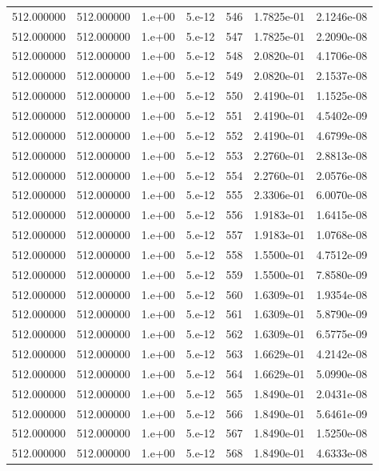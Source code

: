 \begin{table}[htbp]
\begin{tabular}{rrrrrrr}
512.000000 & 512.000000 & 1.e+00 & 5.e-12 & 546 & 1.7825e-01 & 2.1246e-08 \\
512.000000 & 512.000000 & 1.e+00 & 5.e-12 & 547 & 1.7825e-01 & 2.2090e-08 \\
512.000000 & 512.000000 & 1.e+00 & 5.e-12 & 548 & 2.0820e-01 & 4.1706e-08 \\
512.000000 & 512.000000 & 1.e+00 & 5.e-12 & 549 & 2.0820e-01 & 2.1537e-08 \\
512.000000 & 512.000000 & 1.e+00 & 5.e-12 & 550 & 2.4190e-01 & 1.1525e-08 \\
512.000000 & 512.000000 & 1.e+00 & 5.e-12 & 551 & 2.4190e-01 & 4.5402e-09 \\
512.000000 & 512.000000 & 1.e+00 & 5.e-12 & 552 & 2.4190e-01 & 4.6799e-08 \\
512.000000 & 512.000000 & 1.e+00 & 5.e-12 & 553 & 2.2760e-01 & 2.8813e-08 \\
512.000000 & 512.000000 & 1.e+00 & 5.e-12 & 554 & 2.2760e-01 & 2.0576e-08 \\
512.000000 & 512.000000 & 1.e+00 & 5.e-12 & 555 & 2.3306e-01 & 6.0070e-08 \\
512.000000 & 512.000000 & 1.e+00 & 5.e-12 & 556 & 1.9183e-01 & 1.6415e-08 \\
512.000000 & 512.000000 & 1.e+00 & 5.e-12 & 557 & 1.9183e-01 & 1.0768e-08 \\
512.000000 & 512.000000 & 1.e+00 & 5.e-12 & 558 & 1.5500e-01 & 4.7512e-09 \\
512.000000 & 512.000000 & 1.e+00 & 5.e-12 & 559 & 1.5500e-01 & 7.8580e-09 \\
512.000000 & 512.000000 & 1.e+00 & 5.e-12 & 560 & 1.6309e-01 & 1.9354e-08 \\
512.000000 & 512.000000 & 1.e+00 & 5.e-12 & 561 & 1.6309e-01 & 5.8790e-09 \\
512.000000 & 512.000000 & 1.e+00 & 5.e-12 & 562 & 1.6309e-01 & 6.5775e-09 \\
512.000000 & 512.000000 & 1.e+00 & 5.e-12 & 563 & 1.6629e-01 & 4.2142e-08 \\
512.000000 & 512.000000 & 1.e+00 & 5.e-12 & 564 & 1.6629e-01 & 5.0990e-08 \\
512.000000 & 512.000000 & 1.e+00 & 5.e-12 & 565 & 1.8490e-01 & 2.0431e-08 \\
512.000000 & 512.000000 & 1.e+00 & 5.e-12 & 566 & 1.8490e-01 & 5.6461e-09 \\
512.000000 & 512.000000 & 1.e+00 & 5.e-12 & 567 & 1.8490e-01 & 1.5250e-08 \\
512.000000 & 512.000000 & 1.e+00 & 5.e-12 & 568 & 1.8490e-01 & 4.6333e-08 \\

\end{tabular}
\end{table}
